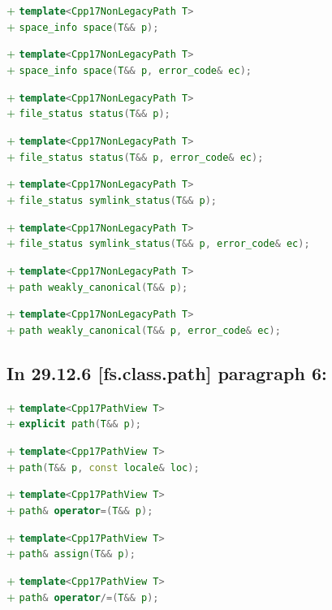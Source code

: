 \documentclass[11pt]{article}
\newcommand{\code}[2][cpp]{\lstinline[language=#1,basicstyle=\small\ttfamily]{#2}}
\newcommand{\tsrefp}[3]{\subsection*{In #2 \textbf{[#1]} paragraph #3:}}
\newcommand{\tsreplace}[3]{\textcolor{red}{\sout{#1}}#2\textcolor{darkgreen}{#3}}
\begin{document}
\tsreplace{}{}{+ \code{template<Cpp17NonLegacyPath T>}}\\
\tsreplace{}{}{+ \code{space_info space(T&& p);}}

\tsreplace{}{}{+ \code{template<Cpp17NonLegacyPath T>}}\\
\tsreplace{}{}{+ \code{space_info space(T&& p, error_code& ec);}}

\tsreplace{}{}{+ \code{template<Cpp17NonLegacyPath T>}}\\
\tsreplace{}{}{+ \code{file_status status(T&& p);}}

\tsreplace{}{}{+ \code{template<Cpp17NonLegacyPath T>}}\\
\tsreplace{}{}{+ \code{file_status status(T&& p, error_code& ec);}}

\tsreplace{}{}{+ \code{template<Cpp17NonLegacyPath T>}}\\
\tsreplace{}{}{+ \code{file_status symlink_status(T&& p);}}

\tsreplace{}{}{+ \code{template<Cpp17NonLegacyPath T>}}\\
\tsreplace{}{}{+ \code{file_status symlink_status(T&& p, error_code& ec);}}

\tsreplace{}{}{+ \code{template<Cpp17NonLegacyPath T>}}\\
\tsreplace{}{}{+ \code{path weakly_canonical(T&& p);}}

\tsreplace{}{}{+ \code{template<Cpp17NonLegacyPath T>}}\\
\tsreplace{}{}{+ \code{path weakly_canonical(T&& p, error_code& ec);}}


\tsrefp{fs.class.path}{29.12.6}{6}

\tsreplace{}{}{+ \code{template<Cpp17PathView T>}}\\
\tsreplace{}{}{+ \code{explicit path(T&& p);}}

\tsreplace{}{}{+ \code{template<Cpp17PathView T>}}\\
\tsreplace{}{}{+ \code{path(T&& p, const locale& loc);}}

\tsreplace{}{}{+ \code{template<Cpp17PathView T>}}\\
\tsreplace{}{}{+ \code{path& operator=(T&& p);}}

\tsreplace{}{}{+ \code{template<Cpp17PathView T>}}\\
\tsreplace{}{}{+ \code{path& assign(T&& p);}}

\tsreplace{}{}{+ \code{template<Cpp17PathView T>}}\\
\tsreplace{}{}{+ \code{path& operator/=(T&& p);}}
\end{document}
